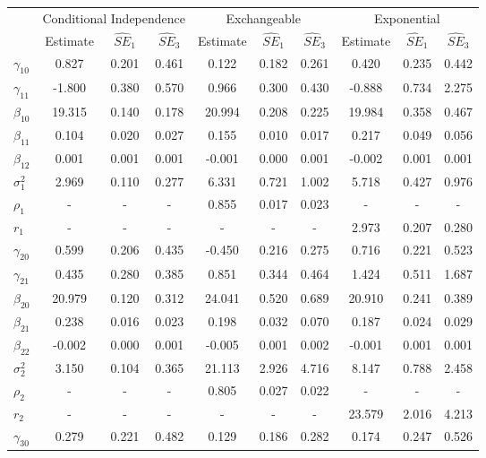 \begin{table}[ht]
\begin{center}
\begin{tabular}{lccccccccc}
  \hline  &\multicolumn{3}{c}{Conditional Independence}&\multicolumn{3}{c}{Exchangeable}&\multicolumn{3}{c}{Exponential}\\ &Estimate&$\widehat{SE}_1$&$\widehat{SE}_3$&Estimate&$\widehat{SE}_1$&$\widehat{SE}_3$&Estimate&$\widehat{SE}_1$&$\widehat{SE}_3$\\\hline  $\gamma_{10}$ & 0.827 & 0.201 & 0.461 & 0.122 & 0.182 & 0.261 & 0.420 & 0.235 & 0.442 \\ 
 $\gamma_{11}$ & -1.800 & 0.380 & 0.570 & 0.966 & 0.300 & 0.430 & -0.888 & 0.734 & 2.275 \\ 
 $\beta_{10}$ & 19.315 & 0.140 & 0.178 & 20.994 & 0.208 & 0.225 & 19.984 & 0.358 & 0.467 \\ 
 $\beta_{11}$ & 0.104 & 0.020 & 0.027 & 0.155 & 0.010 & 0.017 & 0.217 & 0.049 & 0.056 \\ 
$\beta_{12}$ & 0.001 & 0.001 & 0.001 & -0.001 & 0.000 & 0.001 & -0.002 & 0.001 & 0.001 \\ 
 $\sigma_1^2$ & 2.969 & 0.110 & 0.277 & 6.331 & 0.721 & 1.002 & 5.718 & 0.427 & 0.976 \\ 
 $\rho_1$ & - & - & - & 0.855 & 0.017 & 0.023 & - & - & - \\ 
 $r_1$ & - & - & - & - & - & - & 2.973 & 0.207 & 0.280 \\ 
 $\gamma_{20}$ & 0.599 & 0.206 & 0.435 & -0.450 & 0.216 & 0.275 & 0.716 & 0.221 & 0.523 \\ 
     $\gamma_{21}$ & 0.435 & 0.280 & 0.385 & 0.851 & 0.344 & 0.464 & 1.424 & 0.511 & 1.687 \\ 
     $\beta_{20}$ & 20.979 & 0.120 & 0.312 & 24.041 & 0.520 & 0.689 & 20.910 & 0.241 & 0.389 \\ 
     $\beta_{21}$ & 0.238 & 0.016 & 0.023 & 0.198 & 0.032 & 0.070 & 0.187 & 0.024 & 0.029 \\ 
     $\beta_{22}$ & -0.002 & 0.000 & 0.001 & -0.005 & 0.001 & 0.002 & -0.001 & 0.001 & 0.001 \\ 
     $\sigma_2^2$ & 3.150 & 0.104 & 0.365 & 21.113 & 2.926 & 4.716 & 8.147 & 0.788 & 2.458 \\ 
     $\rho_2$ & - & - & - & 0.805 & 0.027 & 0.022 & - & - & - \\ 
     $r_2$ & - & - & - & - & - & - & 23.579 & 2.016 & 4.213 \\ 
 $\gamma_{30}$ & 0.279 & 0.221 & 0.482 & 0.129 & 0.186 & 0.282 & 0.174 & 0.247 & 0.526 \\ 

\end{tabular}
\end{center}
\end{table}
